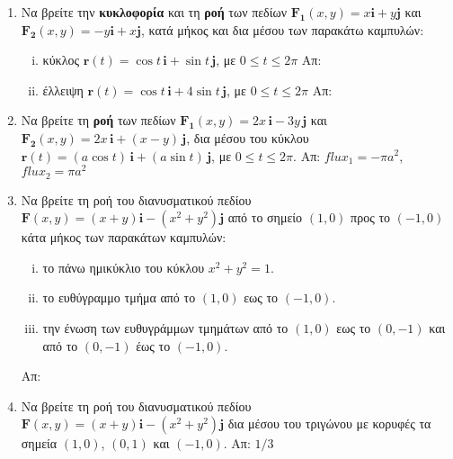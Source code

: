 \begin{enumerate}
  \item Να βρείτε την \textbf{κυκλοφορία} και τη \textbf{ροή} των πεδίων 
    $ \mathbf{F_{1}}(x,y) = x \mathbf{i} + y \mathbf{j} $ και $ \mathbf{F_{2}}(x,y) = 
    -y\mathbf{i} + x \mathbf{j} $, κατά μήκος και δια μέσου των παρακάτω καμπυλών:
    \begin{enumerate}[i)]
      \item κύκλος $ \mathbf{r}(t)= \cos{t}\, \mathbf{i} + \sin{t}\, \mathbf{j}$, με 
        $ 0 \leq t \leq 2 \pi $ 
        \hfill Απ: 
      \item έλλειψη $ \mathbf{r}(t)= \cos{t}\, \mathbf{i} + 4\sin{t}\, \mathbf{j}$, με 
        $ 0 \leq t \leq 2 \pi $ 
        \hfill Απ:  
    \end{enumerate}

  \item Να βρείτε τη \textbf{ροή} των πεδίων $ \mathbf{F_{1}}(x,y) = 2x \,\mathbf{i} - 3y
    \, \mathbf{j} $ και $ \mathbf{F_{2}}(x,y) = 
    2x \, \mathbf{i} + (x-y)\, \mathbf{j} $, δια μέσου του κύκλου $ \mathbf{r}(t)=(a
    \cos{t})\,
    \mathbf{i} + (a \sin{t})\, \mathbf{j} $, με $ 0 \leq t \leq 2 \pi $.
    \hfill Απ: $ flux_{1}=- \pi a^{2} $, $ flux_{2}= \pi a^{2} $ 

  \item Να βρείτε τη ροή του διανυσματικού πεδίου $ \mathbf{F}(x,y) = (x+y) \mathbf{i}
    - (x^{2}+y^{2}) \mathbf{j} $ από το σημείο $ (1,0) $ προς το $ (-1,0) $ κάτα μήκος 
    των παρακάτων καμπυλών:
    \begin{enumerate}[i)]
      \item το πάνω ημικύκλιο του κύκλου $ x^{2}+y^{2}=1 $.
      \item το ευθύγραμμο τμήμα από το $ (1,0) $ εως το $ (-1,0) $.
      \item την ένωση των ευθυγράμμων τμημάτων από το $ (1,0) $ εως το $ (0,-1) $ και 
        από το $ (0,-1) $ έως το $ (-1,0) $.
    \end{enumerate}
    \hfill Απ: 

  \item Να βρείτε τη ροή του διανυσματικού πεδίου $ \mathbf{F}(x,y) = (x+y) \mathbf{i}
    - (x^{2}+y^{2}) \mathbf{j} $ δια μέσου του τριγώνου με κορυφές τα σημεία $ (1,0) $, 
    $ (0,1) $ και $ (-1,0) $. \hfill Απ: $1/3$ 

\end{enumerate}








